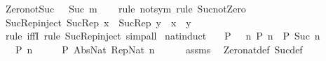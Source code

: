 \begin{isabellebody}
\endisatagproof
{\isafoldproof}%
%
\isadelimproof
\isanewline
%
\endisadelimproof
\isanewline
{}\isamarkupfalse%
\ Zero{\isacharunderscore}{\kern0pt}not{\isacharunderscore}{\kern0pt}Suc{\isacharcolon}{\kern0pt}\ {\isachardoublequoteopen}{}\ {\isasymnoteq}\ Suc\ m{\isachardoublequoteclose}\isanewline
%
\isadelimproof
\ \ %
\endisadelimproof
%
\isatagproof
{}\isamarkupfalse%
\ {\isacharparenleft}{\kern0pt}rule\ not{\isacharunderscore}{\kern0pt}sym{\isacharparenright}{\kern0pt}\ {\isacharparenleft}{\kern0pt}rule\ Suc{\isacharunderscore}{\kern0pt}not{\isacharunderscore}{\kern0pt}Zero{\isacharparenright}{\kern0pt}%
\endisatagproof
{\isafoldproof}%
%
\isadelimproof
\isanewline
%
\endisadelimproof
\isanewline
{}\isamarkupfalse%
\ Suc{\isacharunderscore}{\kern0pt}Rep{\isacharunderscore}{\kern0pt}inject{\isacharprime}{\kern0pt}{\isacharcolon}{\kern0pt}\ {\isachardoublequoteopen}Suc{\isacharunderscore}{\kern0pt}Rep\ x\ {\isacharequal}{\kern0pt}\ Suc{\isacharunderscore}{\kern0pt}Rep\ y\ {\isasymlongleftrightarrow}\ x\ {\isacharequal}{\kern0pt}\ y{\isachardoublequoteclose}\isanewline
%
\isadelimproof
\ \ %
\endisadelimproof
%
\isatagproof
{}\isamarkupfalse%
\ {\isacharparenleft}{\kern0pt}rule\ iffI{\isacharcomma}{\kern0pt}\ rule\ Suc{\isacharunderscore}{\kern0pt}Rep{\isacharunderscore}{\kern0pt}inject{\isacharparenright}{\kern0pt}\ simp{\isacharunderscore}{\kern0pt}all%
\endisatagproof
{\isafoldproof}%
%
\isadelimproof
\isanewline
%
\endisadelimproof
\isanewline
{}\isamarkupfalse%
\ nat{\isacharunderscore}{\kern0pt}induct{}{\isacharcolon}{\kern0pt}\isanewline
\ \ \ {\isachardoublequoteopen}P\ {}{\isachardoublequoteclose}\ \ {\isachardoublequoteopen}{\isasymAnd}n{\isachardot}{\kern0pt}\ P\ n\ {\isasymLongrightarrow}\ P\ {\isacharparenleft}{\kern0pt}Suc\ n{\isacharparenright}{\kern0pt}{\isachardoublequoteclose}\isanewline
\ \ \ {\isachardoublequoteopen}P\ n{\isachardoublequoteclose}\isanewline
%
\isadelimproof
%
\endisadelimproof
%
\isatagproof
{}\isamarkupfalse%
\ {\isacharminus}{\kern0pt}\isanewline
\ \ \isamarkupfalse%
\ {\isachardoublequoteopen}P\ {\isacharparenleft}{\kern0pt}Abs{\isacharunderscore}{\kern0pt}Nat\ {\isacharparenleft}{\kern0pt}Rep{\isacharunderscore}{\kern0pt}Nat\ n{\isacharparenright}{\kern0pt}{\isacharparenright}{\kern0pt}{\isachardoublequoteclose}\isanewline
\ \ \ \ \isamarkupfalse%
\ assms\ \isamarkupfalse%
\ Zero{\isacharunderscore}{\kern0pt}nat{\isacharunderscore}{\kern0pt}def\ Suc{\isacharunderscore}{\kern0pt}def\isanewline

\end{isabellebody}
